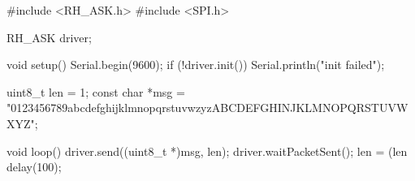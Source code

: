 #include <RH_ASK.h>
#include <SPI.h> 

RH_ASK driver;

void setup()
{
  Serial.begin(9600);
  if (!driver.init())
    Serial.println("init failed");
}

uint8_t len = 1;
const char *msg = "0123456789abcdefghijklmnopqrstuvwzyzABCDEFGHINJKLMNOPQRSTUVWXYZ";

void loop()
{
  driver.send((uint8_t *)msg, len);
  driver.waitPacketSent();
  len = (len %
  delay(100);
}